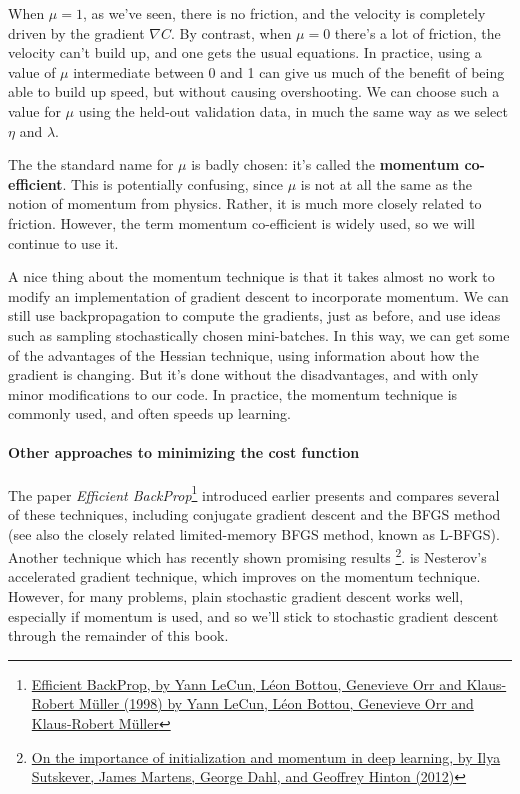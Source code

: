 \documentclass[12pt, letterpaper]{article}
\theoremstyle{definition}
\let\ti\textit
\let\tb\textbf
\begin{document}
When $\mu=1$, as we've seen, there is no friction, and the velocity is completely driven by the gradient $\nabla C$. By contrast, when $\mu=0$ there's a lot of friction, the velocity can't build up, and one gets the usual equations. In practice, using a value of $\mu$ intermediate between $0$ and 1 can give us much of the benefit of being able to build up speed, but without causing overshooting. We can choose such a value for $\mu$ using the held-out validation data, in much the same way as we select $\eta$ and $\lambda$.

The the standard name for $\mu$ is badly chosen: it's called the \tb{momentum co-efficient}. This is potentially confusing, since $\mu$ is not at all the same as the notion of momentum from physics. Rather, it is much more closely related to friction. However, the term momentum co-efficient is widely used, so we will continue to use it.

A nice thing about the momentum technique is that it takes almost no work to modify an implementation of gradient descent to incorporate momentum. We can still use backpropagation to compute the gradients, just as before, and use ideas such as sampling stochastically chosen mini-batches. In this way, we can get some of the advantages of the Hessian technique, using information about how the gradient is changing. But it's done without the disadvantages, and with only minor modifications to our code. In practice, the momentum technique is commonly used, and often speeds up learning.

\paragraph{\tb{Other approaches to minimizing the cost function}}
The paper \ti{Efficient BackProp}\footnote{\href{http://yann.lecun.com/exdb/publis/pdf/lecun-98b.pdf}{Efficient BackProp, by Yann LeCun, Léon Bottou, Genevieve Orr and Klaus-Robert Müller (1998) by Yann LeCun, Léon Bottou, Genevieve Orr and Klaus-Robert Müller}} introduced earlier presents and compares several of these techniques, including conjugate gradient descent and the BFGS method (see also the closely related limited-memory BFGS method, known as L-BFGS). Another technique which has recently shown promising results \footnote{\href{http://www.cs.toronto.edu/~hinton/absps/momentum.pdf}{On the importance of initialization and momentum in deep learning, by Ilya Sutskever, James Martens, George Dahl, and Geoffrey Hinton (2012)}}. is Nesterov's accelerated gradient technique, which improves on the momentum technique. However, for many problems, plain stochastic gradient descent works well, especially if momentum is used, and so we'll stick to stochastic gradient descent through the remainder of this book.
\end{document}
